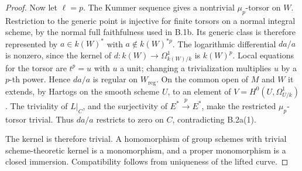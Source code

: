 \begin{proof}
Now let $\ell=p$.  The Kummer sequence gives a nontrivial
$\mu_p$-torsor on $W$.  Restriction to the generic point is injective
for finite torsors on a normal integral scheme, by the normal full
faithfulness used in B.1b.  Its generic class is therefore represented
by $a\in k(W)^*$ with $a\notin k(W)^{*p}$.  The logarithmic differential
$da/a$ is nonzero, since the kernel of $d:k(W)\to
\Omega^1_{k(W)/k}$ is $k(W)^p$.  Local equations for the torsor are
$t^p=u$ with $u$ a unit; changing a trivialization multiplies $u$ by a
$p$-th power.  Hence $da/a$ is regular on $W_{\mathrm{reg}}$.
On the common open of $M$ and $W$ it extends, by Hartogs on the smooth
scheme $U$, to an element of $V=H^0(U,\Omega^1_{U/k})$.
The triviality of $L|_C$, and the surjectivity of $E^*\xrightarrow{p}E^*$,
make the restricted $\mu_p$-torsor trivial.  Thus $da/a$ restricts to
zero on $C$, contradicting B.2a(1).

The kernel is therefore trivial.  A homomorphism of group schemes with
trivial scheme-theoretic kernel is a monomorphism, and a proper
monomorphism is a closed immersion.  Compatibility follows from
uniqueness of the lifted curve.
\end{proof}

